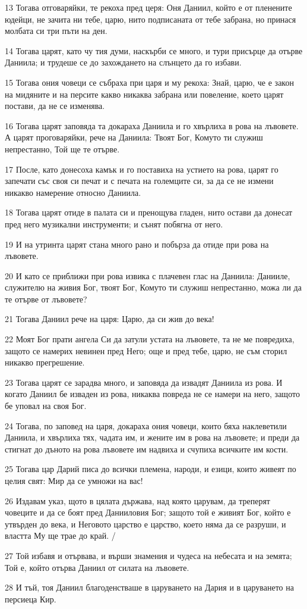 \par 13 Тогава отговаряйки, те рекоха пред церя: Оня Даниил, който е от пленените юдейци, не зачита ни тебе, царю, нито подписаната от тебе забрана, но принася молбата си три пъти на ден.
\par 14 Тогава царят, като чу тия думи, наскърби се много, и тури присърце да отърве Даниила; и трудеше се до захождането на слънцето да го избави.
\par 15 Тогава ония човеци се събраха при царя и му рекоха: Знай, царю, че е закон на мидяните и на персите какво никаква забрана или повеление, което царят постави, да не се изменява.
\par 16 Тогава царят заповяда та докараха Даниила и го хвърлиха в рова на лъвовете. А царят проговаряйки, рече на Даниила: Твоят Бог, Комуто ти служиш непрестанно, Той ще те отърве.
\par 17 После, като донесоха камък и го поставиха на устието на рова, царят го запечати със своя си печат и с печата на големците си, за да се не измени никакво намерение относно Даниила.
\par 18 Тогава царят отиде в палата си и пренощува гладен, нито остави да донесат пред него музикални инструменти; и сънят побягна от него.
\par 19 И на утринта царят стана много рано и побърза да отиде при рова на лъвовете.
\par 20 И като се приближи при рова извика с плачевен глас на Даниила: Данииле, служителю на живия Бог, твоят Бог, Комуто ти служиш непрестанно, можа ли да те отърве от лъвовете?
\par 21 Тогава Даниил рече на царя: Царю, да си жив до века!
\par 22 Моят Бог прати ангела Си да затули устата на лъвовете, та не ме повредиха, защото се намерих невинен пред Него; още и пред тебе, царю, не съм сторил никакво прегрешение.
\par 23 Тогава царят се зарадва много, и заповяда да извадят Даниила из рова. И когато Даниил бе изваден из рова, никаква повреда не се намери на него, защото бе уповал на своя Бог.
\par 24 Тогава, по заповед на царя, докараха ония човеци, които бяха наклеветили Даниила, и хвърлиха тях, чадата им, и жените им в рова на лъвовете; и преди да стигнат до дъното на рова лъвовете им надвиха и счупиха всичките им кости.
\par 25 Тогава цар Дарий писа до всички племена, народи, и езици, които живеят по целия свят: Мир да се умножи на вас!
\par 26 Издавам указ, щото в цялата държава, над която царувам, да треперят човеците и да се боят пред Данииловия Бог; защото той е живият Бог, който е утвърден до века, и Неговото царство е царство, което няма да се разруши, и властта Му ще трае до край. /
\par 27 Той избавя и отървава, и върши знамения и чудеса на небесата и на земята; Той е, който отърва Даниил от силата на лъвовете.
\par 28 И тъй, тоя Даниил благоденстваше в царуването на Дария и в царуването на персиеца Кир.

